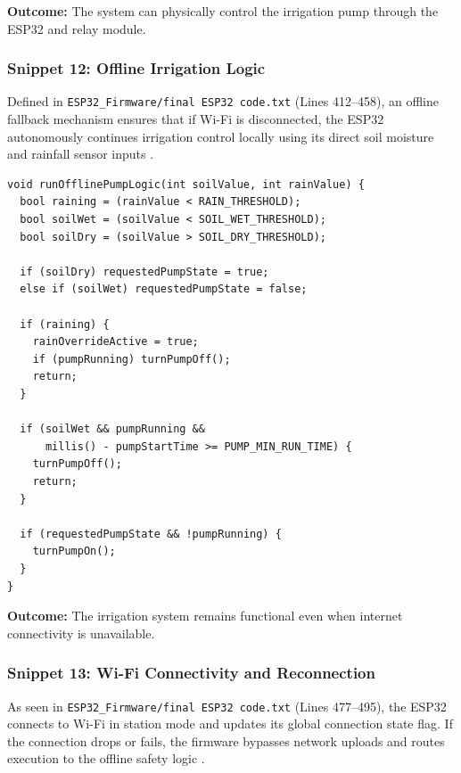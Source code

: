 \textbf{Outcome:} The system can physically control the irrigation 
pump through the ESP32 and relay module.

\subsubsection{Snippet 12: Offline Irrigation Logic}
\label{subsec:snippet12}

Defined in \texttt{ESP32\_Firmware/final ESP32 code.txt} (Lines 412--458), an offline fallback mechanism ensures that if Wi-Fi is disconnected, the ESP32 autonomously continues irrigation control 
locally using its direct soil moisture and rainfall sensor inputs 
\cite{emon2025iot}.

\begin{lstlisting}
void runOfflinePumpLogic(int soilValue, int rainValue) {
  bool raining = (rainValue < RAIN_THRESHOLD);
  bool soilWet = (soilValue < SOIL_WET_THRESHOLD);
  bool soilDry = (soilValue > SOIL_DRY_THRESHOLD);

  if (soilDry) requestedPumpState = true;
  else if (soilWet) requestedPumpState = false;

  if (raining) {
    rainOverrideActive = true;
    if (pumpRunning) turnPumpOff();
    return;
  }

  if (soilWet && pumpRunning &&
      millis() - pumpStartTime >= PUMP_MIN_RUN_TIME) {
    turnPumpOff();
    return;
  }

  if (requestedPumpState && !pumpRunning) {
    turnPumpOn();
  }
}
\end{lstlisting}

\textbf{Outcome:} The irrigation system remains functional even 
when internet connectivity is unavailable.

\subsubsection{Snippet 13: Wi-Fi Connectivity and Reconnection}
\label{subsec:snippet13}

As seen in \texttt{ESP32\_Firmware/final ESP32 code.txt} (Lines 477--495), the ESP32 connects to Wi-Fi in station mode and updates its global connection state flag. If the connection drops or fails, the firmware bypasses network uploads and routes execution to the offline safety logic \cite{farhan2019iotplatform}.

